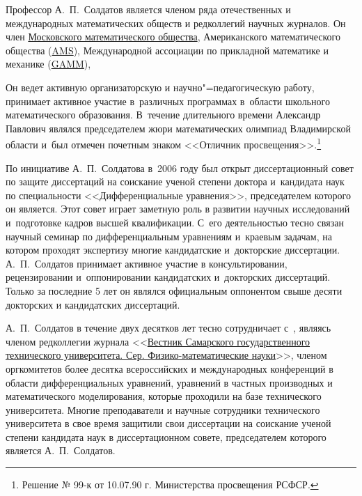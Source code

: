 Профессор А.~П.~Солдатов является членом ряда отечественных и международных математических обществ и редколлегий научных журналов. Он член  \href{http://mms.mathnet.ru/}{Московского математического общества},
Американского математического общества (\href{http://www.ams.org/home/page}{AMS}), 
Международной ассоциации по прикладной математике и механике (\href{https://www.gamm-ev.de/}{GAMM}), 


Он ведет активную организаторскую и научно"=педагогическую работу, принимает активное участие в~различных программах в~области  школьного  математического  образования.  В~течение длительного  времени  Александр Павлович являлся  председателем  жюри  математических олимпиад Владимирской области и~был отмечен почетным знаком <<Отличник просвещения>>.\!\footnote{Решение № 99-к от 10.07.90 г. Министерства просвещения РСФСР.}

\vspace{-3mm}

По инициативе А.~П.~Солдатова в~2006 году был открыт диссертационный совет по защите диссертаций на соискание ученой степени доктора и~кандидата наук по специальности <<Дифференциальные уравнения>>, председателем которого он является. 
Этот совет играет заметную роль в развитии научных исследований  и~подготовке кадров высшей квалификации. 
С~его деятельностью тесно связан научный семинар по дифференциальным уравнениям и~краевым задачам, на котором проходят экспертизу многие кандидатские и~докторские диссертации. 
А.~П.~Солдатов принимает активное участие в консультировании, рецензировании и~оппонировании кандидатских и~докторских диссертаций. 
Только за последние 5 лет он являлся официальным оппонентом свыше  десяти  докторских и кандидатских диссертаций.

А.~П.~Солдатов в течение двух десятков лет тесно сотрудничает с~, являясь членом редколлегии журнала <<\href{http://doi.org/10.14498/vsgtu}{Вестник Самарского государственного технического университета. Сер. Физико-ма\-те\-ма\-ти\-чес\-кие науки}>>, членом оргкомитетов более десятка всероссийских и международных конференций в области дифференциальных уравнений, уравнений в частных производных и математического моделирования, которые проходили на базе технического университета.
Многие преподаватели и научные сотрудники технического университета в свое время защитили свои диссертации на соискание ученой степени кандидата наук в диссертационном совете, председателем которого является А.~П.~Солдатов.


